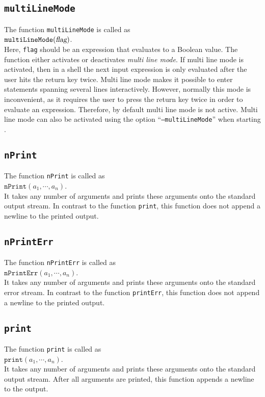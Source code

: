 \subsection{\texttt{multiLineMode}}
The function \texttt{multiLineMode}  is called as
\\[0.2cm]
\hspace*{1.3cm}
$\mathtt{multiLineMode}(\textsl{flag})$.
\\[0.2cm]
Here, \texttt{flag} should be an expression that evaluates to a  Boolean value.  The
function either activates or deactivates \emph{multi line mode}.  If multi line mode is
activated, then in a shell the next input expression is only evaluated after  the user
hits the return key twice.  Multi line mode makes it possible to enter statements spanning
several lines interactively.  However, normally this mode is inconvenient, as it requires
the user to press the return key twice in order to evaluate an expression.  Therefore, by
default multi line mode is not active.  Multi line mode can also be activated using the option 
``\texttt{--multiLineMode}'' when starting \setlx.

\subsection{\texttt{nPrint}}
The function \texttt{nPrint}  is called as
\\[0.2cm]
\hspace*{1.3cm}
$\mathtt{nPrint}(a_1, \cdots, a_n)$.
\\[0.2cm]
It takes any number of arguments and prints these arguments onto the standard output
stream.  In contrast to the function
\texttt{print}, this function does not append a newline to the printed output.

\subsection{\texttt{nPrintErr}}
The function \texttt{nPrintErr}  is called as
\\[0.2cm]
\hspace*{1.3cm}
$\mathtt{nPrintErr}(a_1, \cdots, a_n)$.
\\[0.2cm]
It takes any number of arguments and prints these arguments onto the standard error
stream.  In contrast to the function
\texttt{printErr}, this function does not append a newline to the printed output.

\subsection{\texttt{print}}
The function \texttt{print}  is called as
\\[0.2cm]
\hspace*{1.3cm}
$\mathtt{print}(a_1, \cdots, a_n)$.
\\[0.2cm]
It takes any number of arguments and prints these arguments onto the standard output
stream. After all arguments are
printed, this function appends a newline to the output.

